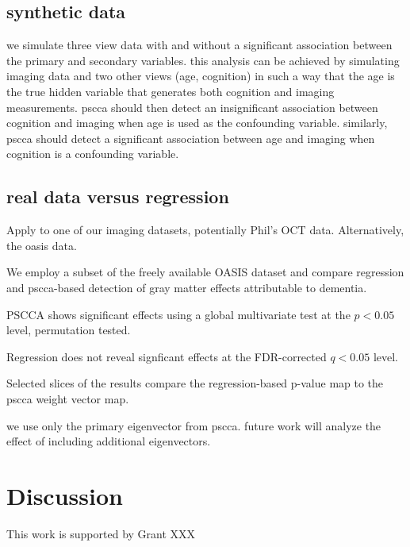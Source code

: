 \documentclass{llncs}
\begin{document}
\subsection{synthetic data}
we simulate three view data with and without a significant association
between the primary and secondary variables.  this analysis can be
achieved by simulating imaging data and two other views (age,
cognition) in such a way that the age is the true hidden variable that
generates both cognition and imaging measurements.  pscca should then
detect an insignificant association between cognition and imaging when
age is used as the confounding variable.  similarly, pscca should
detect a significant association between age and imaging when
cognition is a confounding variable.   

\subsection{real data versus regression}
Apply to one of our imaging datasets, potentially Phil's OCT data.
Alternatively, the oasis data. 

We employ a subset of the freely available OASIS dataset and compare
regression and pscca-based detection of gray matter effects
attributable to dementia.

PSCCA shows significant effects using a global multivariate test at
the $p<0.05$ level, permutation tested.  

Regression does not reveal signficant effects at the FDR-corrected
$q<0.05$ level.  

Selected slices of the results compare the regression-based p-value
map to the pscca weight vector map.  

we use only the primary eigenvector from pscca.  future work will
analyze the effect of including additional eigenvectors. 

\section{Discussion}

 This work is supported by Grant XXX 


\end{document}
